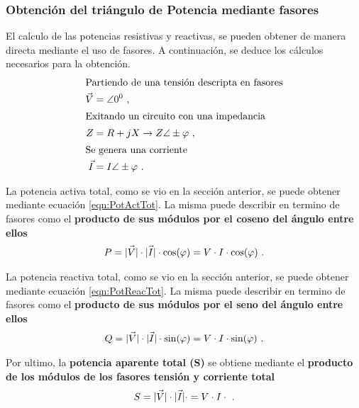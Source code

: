          \subsubsection{Obtención del triángulo de Potencia mediante fasores}
            
            El calculo de las potencias resistivas y reactivas, se pueden obtener de manera
            directa mediante el uso de fasores. A continuación, se deduce los cálculos
            necesarios para la obtención.
               \begin{align}
                  \intertext{Partiendo de una tensión descripta en fasores}
                  \vec{V}  &=  \angle 0^0 \ , \notag \\
                  \intertext{Exitando un circuito con una impedancia}
                  Z        &= R + jX \rightarrow Z \angle \pm \varphi \ , \notag \\ 
                  \intertext{Se genera una corriente}
                  \vec{I}  &= I \angle \pm   \varphi  \ . \notag
               \end{align}

            La potencia activa total, como se vio en la sección anterior, se puede obtener 
            mediante ecuación \ref{eqn:PotActTot}. La misma puede describir en termino de 
            fasores como el \textbf{producto de sus módulos por el coseno del ángulo entre ellos}
               \begin{align}
                  P = \vec{|V|}\cdot \vec{|I|}\cdot \cos(\varphi) = V\cdot I\cdot \cos(\varphi) \ . \notag
               \end{align}   

            La potencia reactiva total, como se vio en la sección anterior, se puede obtener 
            mediante ecuación \ref{eqn:PotReacTot}. La misma puede describir en termino de 
            fasores como el \textbf{producto de sus módulos por el seno del ángulo entre ellos}
               \begin{align}
                  Q = \vec{|V|}\cdot \vec{|I|}\cdot \sin(\varphi) = V\cdot I\cdot \sin(\varphi) \ . \notag
               \end{align}               
            
            Por ultimo, la \textbf{potencia aparente total (S)} se obtiene mediante el 
            \textbf{producto de los módulos de los fasores tensión y corriente total}  
               \begin{align}
                  S = \vec{|V|}\cdot \vec{|I|}\cdot = V\cdot I\cdot \ . \notag
               \end{align}
            
